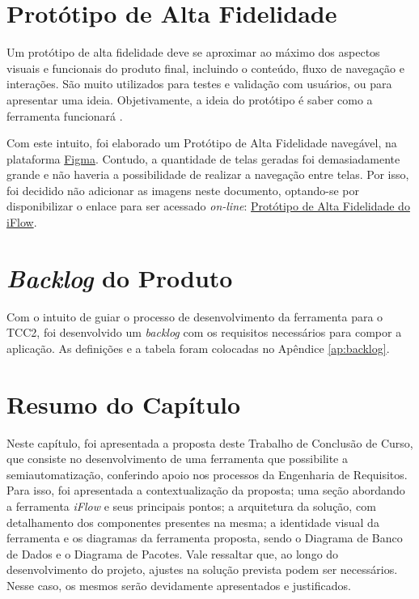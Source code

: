 \section{Protótipo de Alta Fidelidade}

\label{sec:prototipo_de_alta_fidelidade}

Um protótipo de alta fidelidade deve se aproximar ao máximo dos aspectos visuais e funcionais do produto final, incluindo o conteúdo, fluxo de navegação e interações. São muito utilizados para testes e validação com usuários, ou para apresentar uma ideia. Objetivamente, a ideia do protótipo é saber como a ferramenta funcionará \cite{hf_prototype}.

Com este intuito, foi elaborado um Protótipo de Alta Fidelidade navegável, na plataforma \href{https://www.figma.com/}{Figma}. Contudo, a quantidade de telas geradas foi demasiadamente grande e não haveria a possibilidade de realizar a navegação entre telas. Por isso, foi decidido não adicionar as imagens neste documento, optando-se por disponibilizar o enlace para ser acessado \textit{on-line}: \href{https://www.figma.com/proto/8itTrODQ9x6DeKR1nVluW4/TCC---iFlow?node-id=62\:38&scaling=scale-down&page-id=0\:1&starting-point-node-id=62\:38}{Protótipo de Alta Fidelidade do iFlow}.

\section{\textit{Backlog} do Produto}

\label{sec:backlog_do_produto}

Com o intuito de guiar o processo de desenvolvimento da ferramenta para o TCC2, foi desenvolvido um \textit{backlog} com os requisitos necessários para compor a aplicação. As definições e a tabela foram colocadas no Apêndice \ref{ap:backlog}.

\section{Resumo do Capítulo}

Neste capítulo, foi apresentada a proposta deste Trabalho de Conclusão de Curso, que consiste no desenvolvimento de uma ferramenta que possibilite a semiautomatização, conferindo apoio nos processos da Engenharia de Requisitos. Para isso, foi apresentada a contextualização da proposta; uma seção abordando a ferramenta \textit{iFlow} e seus principais pontos; a arquitetura da solução, com detalhamento dos componentes presentes na mesma; a identidade visual da ferramenta e os diagramas da ferramenta proposta, sendo o Diagrama de Banco de Dados e o Diagrama de Pacotes. Vale ressaltar que, ao longo do desenvolvimento do projeto, ajustes na solução prevista podem ser necessários. Nesse caso, os mesmos serão devidamente apresentados e justificados.